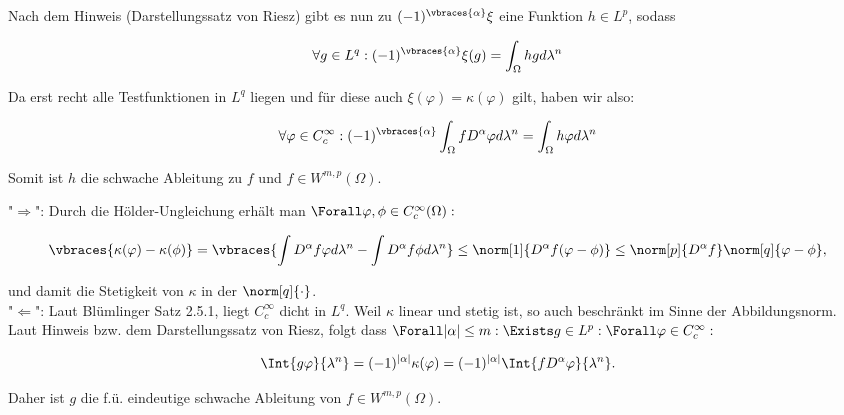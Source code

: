 \begin{solution}
Nach dem Hinweis (Darstellungssatz von Riesz) gibt es nun zu
$(-1)^{\vbraces{\alpha}}\xi$ eine Funktion $h \in L^p$, sodass

\begin{equation*}
  \forall g \in L^q: (-1)^{\vbraces{\alpha}}\xi(g)=\int_{\Omega}hgd\lambda^n
\end{equation*}

Da erst recht alle Testfunktionen in $L^q$ liegen und für diese auch
$\xi(\varphi) = \kappa(\varphi)$ gilt, haben wir also:

\begin{equation*}
  \forall \varphi\in C^{\infty}_c:(-1)^{\vbraces{\alpha}}\int_{\Omega}
  fD^{\alpha}\varphi d\lambda^n = \int_{\Omega}h\varphi d\lambda^n
\end{equation*}

Somit ist $h$ die schwache Ableitung zu $f$ und $f\in W^{m,p}(\Omega)$.

\end{solution}

\begin{solution}

"$\Rightarrow$": Durch die Hölder-Ungleichung erhält man $\Forall \varphi, \phi \in C_c^\infty(\Omega):$

\begin{equation*}
  \vbraces{\kappa(\varphi) - \kappa(\phi)} =
  \vbraces
  {
    \int D^\alpha f \varphi d \lambda^n -
    \int D^\alpha f \phi d \lambda^n
  } \leq
  \norm[1]{D^\alpha f (\varphi - \phi)} \leq
  \norm[p]{D^\alpha f}
  \norm[q]{\varphi - \phi},
\end{equation*}

und damit die Stetigkeit von $\kappa$ in der $\norm[q]{\cdot}$. \\

"$\Leftarrow$": Laut Blümlinger Satz 2.5.1, liegt $C_c^\infty$ dicht in $L^q$. Weil $\kappa$ linear und stetig ist, so auch beschränkt im Sinne der Abbildungsnorm. Laut Hinweis bzw. dem Darstellungssatz von Riesz, folgt dass $\Forall |\alpha| \leq m: \Exists g \in L^p: \Forall \varphi \in C_c^\infty:$

\begin{align*}
  \Int{g \varphi}{\lambda^n} =
  (-1)^{|\alpha|} \kappa(\varphi) =
  (-1)^{|\alpha|} \Int{f D^\alpha \varphi}{\lambda^n}.
\end{align*}

Daher ist $g$ die f.ü. eindeutige schwache Ableitung von $f \in W^{m, p}(\Omega)$.

\end{solution}
